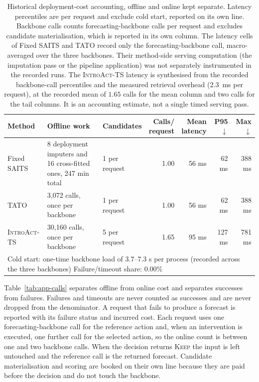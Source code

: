 \documentclass{article}
\newcommand{\introact}{\textsc{IntroAct-TS}}
\begin{document}
\begin{table}[tp]
  \caption{Historical deployment-cost accounting, offline and online kept
  separate. Latency percentiles are per request and exclude cold start, reported on its own
  line. Backbone calls counts forecasting-backbone calls per request and excludes candidate
  materialisation, which is reported in its own column. The latency cells of Fixed SAITS and
  TATO record only the forecasting-backbone call, macro-averaged over the three backbones. Their method-side serving computation (the imputation pass or the pipeline application) was
  not separately instrumented in the recorded runs. The \introact{} latency is synthesised
  from the recorded backbone-call percentiles and the measured retrieval overhead
  ($2.3$~ms per request), at the recorded mean of $1.65$ calls for the mean column and two
  calls for the tail columns. It is an accounting estimate, not a single timed serving pass.}
  \label{tab:app-efficiency}
  \centering
  \small
  \setlength{\tabcolsep}{4pt}
\begin{tabularx}{\textwidth}{@{}lXXrrrr@{}}
    \toprule
    Method & Offline work & Candidates & \shortstack[r]{Calls/\\request} & \shortstack[r]{Mean\\latency} & P95 $\downarrow$ & Max $\downarrow$ \\
    \midrule
    Fixed SAITS           & 8 deployment imputers and 16 cross-fitted ones, 247 min total     & 1 per request     & 1.00     & 56 ms     & 62 ms     & 388 ms \\
    TATO               & 3,072 calls, once per backbone   & 1 per request   & 1.00   & 56 ms   & 62 ms   & 388 ms \\
    \rowcolor{bestgray}\introact{} & 30,160 calls, once per backbone & 5 per request & 1.65 & 95 ms & 127 ms & 781 ms \\
    \midrule
    \multicolumn{7}{p{0.97\textwidth}}{\footnotesize Cold start: one-time backbone load of 3.7--7.3 s per process (recorded across the three backbones) \quad
    Failure/timeout share: 0.00\%} \\
    \bottomrule
  \end{tabularx}
\end{table}

Table~\ref{tab:app-calls} separates offline from online cost and separates successes from
failures. Failures and timeouts are never counted as successes and are never dropped from the
denominator. A request that fails to produce a forecast is reported with its failure status and incurred cost. Each request uses one forecasting-backbone call for the reference action
and, when an intervention is executed, one further call for the selected action, so the online
count is between one and two backbone calls. When the decision returns \textsc{Keep} the input
is left untouched and the reference call is the returned forecast. Candidate materialisation
and scoring are booked on their own line because they are paid before the decision and do not
touch the backbone.
\end{document}
